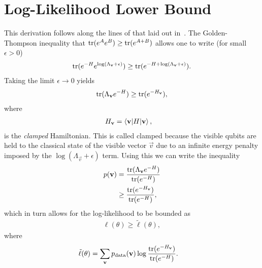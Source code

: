 \section{Log-Likelihood Lower Bound}\label{app:qbm_log_likelihood_lower_bound}
This derivation follows along the lines of that laid out in~\cite{amin_2018}.
The Golden-Thompson inequality that \( \text{tr}(e^{A}e^{B}) \ge \text{tr}(e^{A+B}) \) allows one to write (for small \( \epsilon > 0 \))
\begin{align}
    \text{tr}(e^{-H} e^{\log(\Lambda_{\mathbf{v}}+\epsilon)}) \ge \text{tr}(e^{-H+\log(\Lambda_{\mathbf{v}}+\epsilon)}).
\end{align}
Taking the limit \( \epsilon \rightarrow 0 \) yields
\begin{align}
    \text{tr}(\Lambda_{\mathbf{v}}e^{-H}) \ge \text{tr}(e^{-H_{\mathbf{v}}}),
\end{align}
where
\begin{align}
    H_{\mathbf{v}} &= \braket{\mathbf{v} | H | \mathbf{v}},
\end{align}
is the \textit{clamped} Hamiltonian.
This is called clamped because the visible qubits are held to the classical state of the visible vector \( \vec{v} \) due to an infinite energy penalty imposed by the \( \log(\Lambda_\vec{v} + \epsilon) \) term.
Using this we can write the inequality
\begin{align}
\begin{split}
    p(\mathbf{v})
        &= \frac{\text{tr}(\Lambda_{\mathbf{v}} e^{-H})}{\text{tr}(e^{-H})} \\
        &\ge \frac{\text{tr}(e^{-H_{\mathbf{v}}})}{\text{tr}(e^{-H})},
\end{split}
\end{align}
which in turn allows for the log-likelihood to be bounded as
\begin{align}
    \ell(\theta) \ge \tilde{\ell}(\theta),
\end{align}
where
\begin{align}
    \tilde{\ell}(\theta)
        &= \sum_{\mathbf{v}} p_\text{data}(\mathbf{v}) \log\frac{\text{tr}(e^{-H_{\mathbf{v}}})}{\text{tr}(e^{-H})}.
\end{align}
